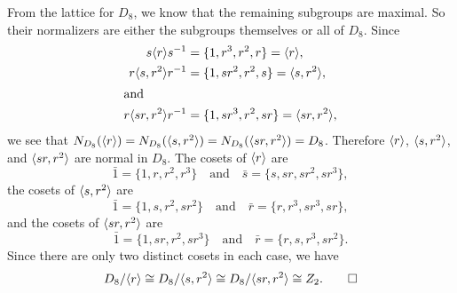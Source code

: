 \begin{solution}
  From the lattice for $D_8$, we know that the remaining subgroups are
  maximal. So their normalizers are either the subgroups themselves or
  all of $D_8$. Since
  \begin{align*}
    s\langle{r}\rangle s^{-1} &= \{1, r^3, r^2, r\} = \langle{r}\rangle, \\
    r\langle{s,r^2}\rangle r^{-1} &= \{1, sr^2, r^2, s\} = \langle{s,r^2}\rangle, \\
  \intertext{and}
    r\langle{sr,r^2}\rangle r^{-1} &= \{1, sr^3, r^2, sr\} = \langle{sr,r^2}\rangle,
  \end{align*}
  we see that
  $N_{D_8}(\langle{r}\rangle) = N_{D_8}(\langle{s,r^2}\rangle) = N_{D_8}(\langle{sr,r^2}\rangle) =
  D_8$. Therefore $\langle{r}\rangle$, $\langle{s,r^2}\rangle$, and $\langle{sr,r^2}\rangle$ are
  normal in $D_8$. The cosets of $\langle{r}\rangle$ are
  \begin{equation*}
    \bar1 = \{1,r,r^2,r^3\}
    \quad\text{and}\quad
    \bar{s} = \{s,sr,sr^2,sr^3\},
  \end{equation*}
  the cosets of $\langle{s,r^2}\rangle$ are
  \begin{equation*}
    \bar1 = \{1,s,r^2,sr^2\}
    \quad\text{and}\quad
    \bar{r} = \{r, r^3, sr^3, sr\},
  \end{equation*}
  and the cosets of $\langle{sr,r^2}\rangle$ are
  \begin{equation*}
    \bar1 = \{1,sr,r^2,sr^3\}
    \quad\text{and}\quad
    \bar{r} = \{r,s,r^3,sr^2\}.
  \end{equation*}
  Since there are only two distinct cosets in each case, we have
  \begin{equation*}
    D_8/\langle{r}\rangle \cong D_8/\langle{s,r^2}\rangle
    \cong D_8/\langle{sr,r^2}\rangle \cong Z_2. \qedhere
  \end{equation*}
\end{solution}

